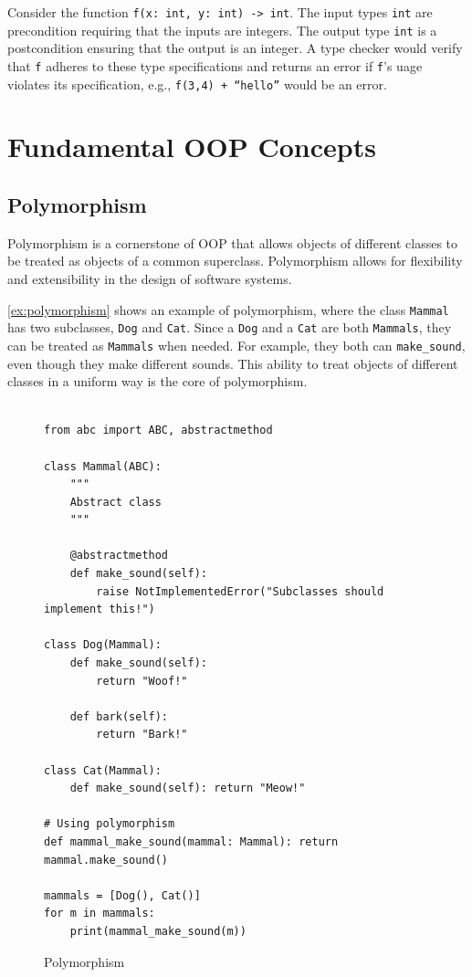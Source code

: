 \documentclass[oneside,11pt,dvipsnames]{book}
\newcommand{\code}[1]{\texttt{#1}}
\begin{document}
Consider the function \code{f(x: int, y: int) -> int}. The input types \code{int} are precondition requiring that the inputs are integers. The output type \code{int} is a postcondition ensuring that the output is an integer. A type checker would verify that \code{f} adheres to these type specifications and returns an error if \code{f}'s uage violates its specification, e.g., \code{f(3,4) + ``hello''} would be an error.


\section{Fundamental OOP Concepts}

\subsection{Polymorphism} Polymorphism is a cornerstone of OOP that allows objects of different classes to be treated as objects of a common superclass.  
Polymorphism allows for flexibility and extensibility in the design of software systems.


\autoref{ex:polymorphism} shows an example of polymorphism, where the class \code{Mammal} has two subclasses, \code{Dog} and \code{Cat}. 
Since a \code{Dog} and a \code{Cat} are both \code{Mammals}, they can be treated as \code{Mammals} when needed. For example, they both can \code{make\_sound}, even though they make different sounds. This ability to treat objects of different classes in a uniform way is the core of polymorphism.

\begin{figure}
\begin{lstlisting}

from abc import ABC, abstractmethod

class Mammal(ABC):
    """
    Abstract class
    """
    
    @abstractmethod
    def make_sound(self):
        raise NotImplementedError("Subclasses should implement this!")

class Dog(Mammal):
    def make_sound(self):
        return "Woof!"

    def bark(self):
        return "Bark!"

class Cat(Mammal):
    def make_sound(self): return "Meow!"
        
# Using polymorphism
def mammal_make_sound(mammal: Mammal): return mammal.make_sound()

mammals = [Dog(), Cat()]
for m in mammals:
    print(mammal_make_sound(m))
\end{lstlisting}
\caption{Polymorphism}\label{ex:polymorphism}
\end{figure}
\end{document}

